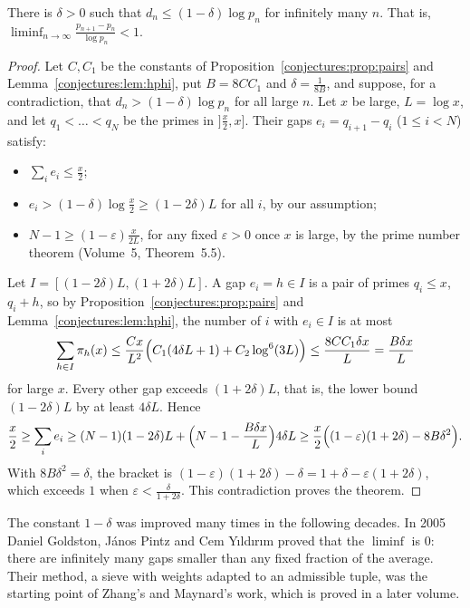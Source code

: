\begin{theorem}[Erd\H{o}s, 1940]\label{conjectures:thm:erdossmall}
There is $\delta>0$ such that $d_n\le(1-\delta)\log p_n$ for infinitely many $n$. That is, $\displaystyle\liminf_{n\to\infty}\frac{p_{n+1}-p_n}{\log p_n}<1$.
\end{theorem}
\begin{proof}
Let $C,C_1$ be the constants of Proposition~\ref{conjectures:prop:pairs} and Lemma~\ref{conjectures:lem:hphi}, put $B=8CC_1$ and $\delta=\frac1{8B}$, and suppose, for a
contradiction, that $d_n>(1-\delta)\log p_n$ for all large $n$. Let $x$ be large, $L=\log x$, and let $q_1<\dots<q_N$ be the primes in $]\frac x2,x]$.
Their gaps $e_i=q_{i+1}-q_i$ ($1\le i<N$) satisfy:
\begin{itemize}
\item $\sum_ie_i\le\frac x2$;
\item $e_i>(1-\delta)\log\frac x2\ge(1-2\delta)L$ for all $i$, by our assumption;
\item $N-1\ge(1-\varepsilon)\frac x{2L}$, for any fixed $\varepsilon>0$ once $x$ is large, by the prime number theorem (Volume~5, Theorem~5.5).
\end{itemize}
Let $I=[(1-2\delta)L,(1+2\delta)L]$. A gap $e_i=h\in I$ is a pair of primes $q_i\le x$, $q_i+h$, so by Proposition~\ref{conjectures:prop:pairs} and
Lemma~\ref{conjectures:lem:hphi}, the number of $i$ with $e_i\in I$ is at most
\[
\sum_{h\in I}\pi_h(x)\le\frac{Cx}{L^2}\Bigl(C_1(4\delta L+1)+C_2\log^6(3L)\Bigr)\le\frac{8CC_1\delta x}L=\frac{B\delta x}L
\]
for large $x$. Every other gap exceeds $(1+2\delta)L$, that is, the lower bound $(1-2\delta)L$ by at least $4\delta L$. Hence
\[
\frac x2\ge\sum_ie_i\ge(N-1)(1-2\delta)L+\Bigl(N-1-\frac{B\delta x}L\Bigr)4\delta L\ge\frac x2\Bigl((1-\varepsilon)(1+2\delta)-8B\delta^2\Bigr).
\]
With $8B\delta^2=\delta$, the bracket is $(1-\varepsilon)(1+2\delta)-\delta=1+\delta-\varepsilon(1+2\delta)$, which exceeds $1$ when $\varepsilon<\frac\delta{1+2\delta}$.
This contradiction proves the theorem.
\end{proof}

The constant $1-\delta$ was improved many times in the following decades. In 2005 Daniel Goldston, J\'anos Pintz and Cem Y\i ld\i r\i m proved that the
$\liminf$ is $0$: there are infinitely many gaps smaller than any fixed fraction of the average. Their method, a sieve with weights adapted to an
admissible tuple, was the starting point of Zhang's and Maynard's work, which is proved in a later volume.

